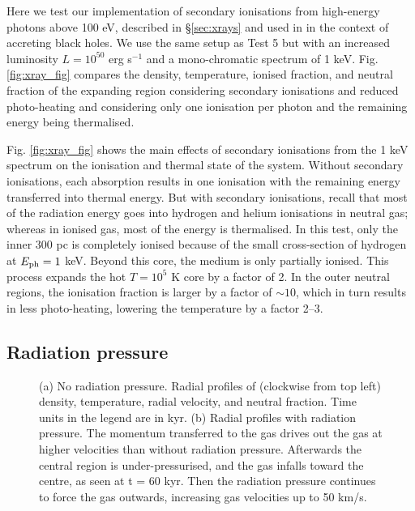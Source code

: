 \documentclass[useAMS,usenatbib]{mn2e}
\begin{document}
Here we test our implementation of secondary ionisations from
high-energy photons above 100 eV, described in \S\ref{sec:xrays} and
used in \citet{Alvarez09} in the context of accreting black holes.  We
use the same setup as Test 5 but with an increased luminosity $L =
10^{50}$ erg s$^{-1}$ and a mono-chromatic spectrum of 1 keV.  Fig.
\ref{fig:xray_fig} compares the density, temperature, ionised
fraction, and neutral fraction of the expanding \hii region
considering secondary ionisations and reduced photo-heating and
considering only one ionisation per photon and the remaining energy
being thermalised.

Fig. \ref{fig:xray_fig} shows the main effects of secondary
ionisations from the 1 keV spectrum on the ionisation and thermal
state of the system.  Without secondary ionisations, each absorption
results in one ionisation with the remaining energy transferred into
thermal energy.  But with secondary ionisations, recall that most of
the radiation energy goes into hydrogen and helium ionisations in
neutral gas; whereas in ionised gas, most of the energy is
thermalised.  In this test, only the inner 300 pc is completely
ionised because of the small cross-section of hydrogen at $E_{\rm ph}
= 1$ keV.  Beyond this core, the medium is only partially ionised.
This process expands the hot $T = 10^5$ K core by a factor of 2.  In
the outer neutral regions, the ionisation fraction is larger by a
factor of $\sim 10$, which in turn results in less photo-heating,
lowering the temperature by a factor 2--3.

\subsection{Radiation pressure}

\begin{figure}
  \caption{\label{fig:rp_profiles} (a) No radiation pressure.
    Radial profiles of (clockwise from top left) density, temperature,
    radial velocity, and neutral fraction.  Time units in the legend
    are in kyr.  (b) Radial profiles with radiation pressure.  The
    momentum transferred to the gas drives out the gas at higher
    velocities than without radiation pressure.  Afterwards the
    central region is under-pressurised, and the gas infalls toward the
    centre, as seen at t = 60 kyr.  Then the radiation pressure
    continues to force the gas outwards, increasing gas velocities up
    to 50 km/s.}
\end{figure}
\end{document}
